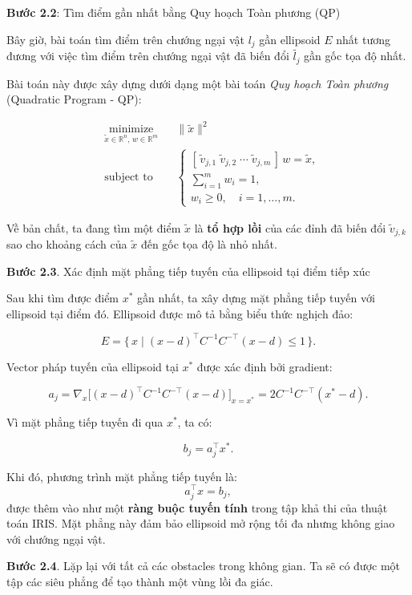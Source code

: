 \documentclass{article}
\begin{document}
\begin{enumerate}
\textbf{Bước 2.2}: Tìm điểm gần nhất bằng Quy hoạch Toàn phương (QP)

Bây giờ, bài toán tìm điểm trên chướng ngại vật $l_j$ gần ellipsoid $E$ nhất tương đương với việc tìm điểm trên chướng ngại vật đã biến đổi $\tilde{l_j}$ gần gốc tọa độ nhất.  

Bài toán này được xây dựng dưới dạng một bài toán \textit{Quy hoạch Toàn phương} (Quadratic Program - QP):

\[
\begin{aligned}
    &\underset{\tilde{x} \in \mathbb{R}^n,\, w \in \mathbb{R}^m}{\text{minimize}} && \|\tilde{x}\|^2 \\
    &\text{subject to} 
    && 
    \begin{cases}
        [\, \tilde{v}_{j,1} \; \tilde{v}_{j,2} \; \cdots \; \tilde{v}_{j,m} \,]\, w = \tilde{x}, \\
        \sum_{i=1}^{m} w_i = 1, \\
        w_i \ge 0, \quad i = 1,\dots,m.
    \end{cases}
\end{aligned}
\]

\noindent
Về bản chất, ta đang tìm một điểm $\tilde{x}$ là \textbf{tổ hợp lồi} của các đỉnh đã biến đổi $\tilde{v}_{j,k}$ sao cho khoảng cách của $\tilde{x}$ đến gốc tọa độ là nhỏ nhất.  

\textbf{Bước 2.3}. Xác định mặt phẳng tiếp tuyến của ellipsoid tại điểm tiếp xúc

Sau khi tìm được điểm \(x^*\) gần nhất, ta xây dựng mặt phẳng tiếp tuyến với ellipsoid tại điểm đó.  
Ellipsoid được mô tả bằng biểu thức nghịch đảo:

\[
E = \{\, x \mid (x - d)^{\top} C^{-1} C^{-\top} (x - d) \le 1 \,\}.
\]

Vector pháp tuyến của ellipsoid tại \(x^*\) được xác định bởi gradient:

\[
a_j = \nabla_x \big[(x - d)^{\top} C^{-1} C^{-\top} (x - d)\big]_{x = x^*}
     = 2C^{-1}C^{-\top}(x^* - d).
\]

Vì mặt phẳng tiếp tuyến đi qua \(x^*\), ta có:

\[
b_j = a_j^{\top}x^*.
\]

Khi đó, phương trình mặt phẳng tiếp tuyến là:
\[
a_j^{\top}x = b_j,
\]
được thêm vào như một \textbf{ràng buộc tuyến tính} trong tập khả thi của thuật toán IRIS.  
Mặt phẳng này đảm bảo ellipsoid mở rộng tối đa nhưng không giao với chướng ngại vật.

\textbf{Bước 2.4}. Lặp lại với tất cả các obstacles trong không gian. Ta sẽ có được một tập các siêu phẳng để tạo thành một vùng lồi đa giác.


\end{enumerate}
\end{document}

